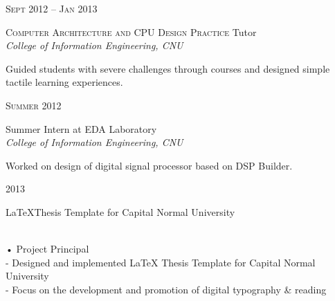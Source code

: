 \documentclass[10pt]{article} %
\begin{document}
\begin{minipage}[t]{0.44\textwidth}


{\raggedleft\textsc{Sept 2012 -- Jan 2013}\par}

{\raggedright \small\textsc{Computer Architecture and CPU Design Practice} Tutor\\
\textit{College of Information Engineering, CNU}\\}

\normalsize{Guided students with severe challenges through courses and designed simple tactile learning experiences.
}\\

{\raggedleft\textsc{Summer 2012}\par}

{\raggedright \small Summer Intern at EDA Laboratory\\
\textit{College of Information Engineering, CNU}\\}

\normalsize{
Worked on design of digital signal processor based on DSP Builder.
}\\

{\raggedleft\textsc{2013}\par}

{\raggedright \small \LaTeX Thesis Template for Capital Normal University } \\
 • Project Principal\\
\normalsize{
-  Designed and implemented LaTeX Thesis Template for Capital Normal University\\
-  Focus on the development and promotion of digital typography \& reading
}







	
\end{minipage} %
\end{document}
